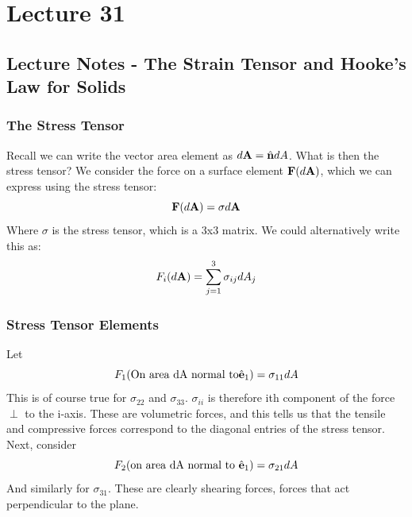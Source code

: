 \documentclass[../PHYS306Notes.tex]{subfiles}
\begin{document}
\section{Lecture 31}
\subsection{Lecture Notes - The Strain Tensor and Hooke's Law for Solids}
\subsubsection{The Stress Tensor}
Recall we can write the vector area element as $d\mathbf{A} = \hat{\mathbf{n}}dA$. What is then the stress tensor? We consider the force on a surface element $\mathbf{F}(d\mathbf{A})$, which we can express using the stress tensor:
\[\mathbf{F}(d\mathbf{A}) = \sigma d\mathbf{A}\]
Where $\sigma$ is the stress tensor, which is a 3x3 matrix. We could alternatively write this as:
\[F_i(d\mathbf{A}) = \sum_{j=1}^3 \sigma_{ij}dA_j\]

\subsubsection{Stress Tensor Elements}
Let
\[F_1(\text{On area dA normal to} \hat{\mathbf{e}}_1) = \sigma_{11}dA\]
This is of course true for $\sigma_{22}$ and $\sigma_{33}$. $\sigma_{ii}$ is therefore ith component of the force $\perp$ to the i-axis. These are volumetric forces, and this tells us that the tensile and compressive forces correspond to the diagonal entries of the stress tensor. Next, consider \[F_2(\text{on area dA normal to } \hat{\mathbf{e}}_1) = \sigma_{21}dA\]
And similarly for $\sigma_{31}$. These are clearly shearing forces, forces that act perpendicular to the plane.
\end{document}
